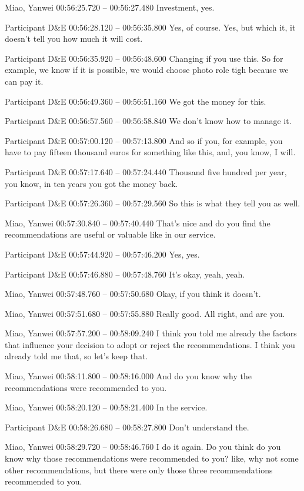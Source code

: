 {Miao, Yanwei 00:56:25.720 -- 00:56:27.480
Investment, yes.

Participant D\&E 00:56:28.120 -- 00:56:35.800
Yes, of course. Yes, but which it, it doesn't tell you how much it will cost.

Participant D\&E 00:56:35.920 -- 00:56:48.600
Changing if you use this. So for example, we know if it is possible, we would choose photo role tigh because we can pay it.

Participant D\&E 00:56:49.360 -- 00:56:51.160
We got the money for this.

Participant D\&E 00:56:57.560 -- 00:56:58.840
We don't know how to manage it.

Participant D\&E 00:57:00.120 -- 00:57:13.800
And so if you, for example, you have to pay fifteen thousand euros for something like this, and, you know, I will.

Participant D\&E 00:57:17.640 -- 00:57:24.440
Thousand five hundred per year, you know, in ten years you got the money back.

Participant D\&E 00:57:26.360 -- 00:57:29.560
So this is what they tell you as well.

Miao, Yanwei 00:57:30.840 -- 00:57:40.440
That's nice and do you find the recommendations are useful or valuable like in our service.

Participant D\&E 00:57:44.920 -- 00:57:46.200
Yes, yes.

Participant D\&E 00:57:46.880 -- 00:57:48.760
It's okay, yeah, yeah.

Miao, Yanwei 00:57:48.760 -- 00:57:50.680
Okay, if you think it doesn't.

Miao, Yanwei 00:57:51.680 -- 00:57:55.880
Really good. All right, and are you.

Miao, Yanwei 00:57:57.200 -- 00:58:09.240
I think you told me already the factors that influence your decision to adopt or reject the recommendations. I think you already told me that, so let's keep that.

Miao, Yanwei 00:58:11.800 -- 00:58:16.000
And do you know why the recommendations were recommended to you.

Miao, Yanwei 00:58:20.120 -- 00:58:21.400
In the service.

Participant D\&E 00:58:26.680 -- 00:58:27.800
Don't understand the.

Miao, Yanwei 00:58:29.720 -- 00:58:46.760
I do it again. Do you think do you know why those recommendations were recommended to you? like, why not some other recommendations, but there were only those three recommendations recommended to you.

}
